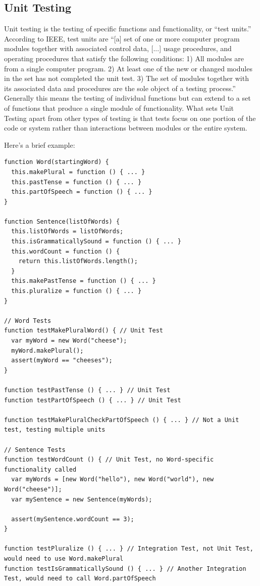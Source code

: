 \documentclass[12pt]{ucthesis}
\begin{document}
\subsection{Unit Testing}
Unit testing is the testing of specific functions and functionality, or ``test units.'' According to IEEE, test units are ``[a] set of one or more computer program modules together with associated control data, [...] usage procedures, and operating procedures that satisfy the following conditions: 1) All modules are from a single computer program. 2) At least one of the new or changed modules in the set has not completed the unit test. 3) The set of modules together with its associated data and procedures are the sole object of a testing process.'' \cite{UnitTestDefinition} Generally this means the testing of individual functions but can extend to a set of functions that produce a single module of functionality. What sets Unit Testing apart from other types of testing is that tests focus on one portion of the code or system rather than interactions between modules or the entire system.

Here's a brief example:
\begin{lstlisting}
function Word(startingWord) {
  this.makePlural = function () { ... }
  this.pastTense = function () { ... }
  this.partOfSpeech = function () { ... }
}

function Sentence(listOfWords) {
  this.listOfWords = listOfWords;
  this.isGrammaticallySound = function () { ... }
  this.wordCount = function () {
    return this.listOfWords.length();
  }
  this.makePastTense = function () { ... }
  this.pluralize = function () { ... }
}

// Word Tests
function testMakePluralWord() { // Unit Test
  var myWord = new Word("cheese");
  myWord.makePlural();
  assert(myWord == "cheeses");
}

function testPastTense () { ... } // Unit Test
function testPartOfSpeech () { ... } // Unit Test

function testMakePluralCheckPartOfSpeech () { ... } // Not a Unit test, testing multiple units

// Sentence Tests
function testWordCount () { // Unit Test, no Word-specific functionality called
  var myWords = [new Word("hello"), new Word("world"), new Word("cheese")];
  var mySentence = new Sentence(myWords);

  assert(mySentence.wordCount == 3);
}

function testPluralize () { ... } // Integration Test, not Unit Test, would need to use Word.makePlural
function testIsGrammaticallySound () { ... } // Another Integration Test, would need to call Word.partOfSpeech

\end{lstlisting}
\end{document}
